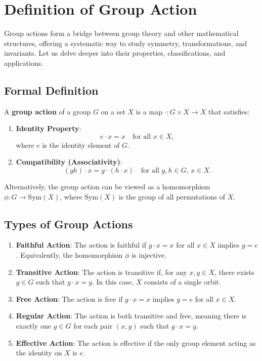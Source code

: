 \documentclass[11pt]{article}
\theoremstyle{definition}
\begin{document}
\section*{Definition of Group Action}

Group actions form a bridge between group theory and other mathematical structures, offering a systematic way to study symmetry, transformations, and invariants. Let us delve deeper into their properties, classifications, and applications.

\subsection*{Formal Definition}

A \textbf{group action} of a group \( G \) on a set \( X \) is a map \( \cdot : G \times X \to X \) that satisfies:

\begin{enumerate}
    \item \textbf{Identity Property}:
    \[
    e \cdot x = x \quad \text{for all } x \in X,
    \]
    where \( e \) is the identity element of \( G \).

    \item \textbf{Compatibility (Associativity)}:
    \[
    (gh) \cdot x = g \cdot (h \cdot x) \quad \text{for all } g, h \in G, \, x \in X.
    \]
\end{enumerate}

Alternatively, the group action can be viewed as a homomorphism \( \phi : G \to \text{Sym}(X) \), where \( \text{Sym}(X) \) is the group of all permutations of \( X \).

\subsection*{Types of Group Actions}

\begin{enumerate}
    \item \textbf{Faithful Action}: The action is faithful if \( g \cdot x = x \) for all \( x \in X \) implies \( g = e \). Equivalently, the homomorphism \( \phi \) is injective.
    
    \item \textbf{Transitive Action}: The action is transitive if, for any \( x, y \in X \), there exists \( g \in G \) such that \( g \cdot x = y \). In this case, \( X \) consists of a single orbit.
    
    \item \textbf{Free Action}: The action is free if \( g \cdot x = x \) implies \( g = e \) for all \( x \in X \).
    
    \item \textbf{Regular Action}: The action is both transitive and free, meaning there is exactly one \( g \in G \) for each pair \( (x, y) \) such that \( g \cdot x = y \).
    
    \item \textbf{Effective Action}: The action is effective if the only group element acting as the identity on \( X \) is \( e \).
\end{enumerate}
\end{document}
